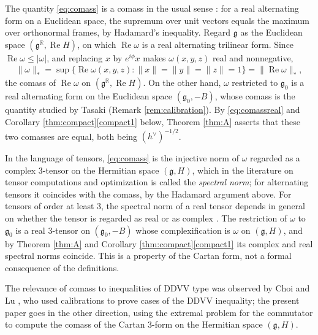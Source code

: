 \documentclass[leqno,10pt]{amsart}
\theoremstyle{definition}
\numberwithin{equation}{section}
\newcommand{\om}{\omega}
\newcommand{\re}{\operatorname{Re}}
\newcommand{\g}{\mathfrak{g}}
\newcommand{\rea}{\mathbb R}
\newcommand{\gz}{\g_{0}}
\newcommand{\hv}{h^\vee}
\newcommand{\norm}[1]{\lVert #1\rVert}
\newcommand{\comass}[1]{\lVert #1\rVert_{\ast}}%
\begin{document}
\begin{remark}\label{rem:comass}
The quantity \eqref{eq:comass} is a comass in the usual sense \cite{Harvey-Lawson}: for a real alternating form on a Euclidean space, the supremum over unit vectors equals the maximum over orthonormal frames, by Hadamard's inequality. Regard $\g$ as the Euclidean space $(\g^{\rea}, \re H)$, on which $\re\om$ is a real alternating trilinear form. Since $\re\om \leq |\om|$, and replacing $x$ by $e^{i\phi}x$ makes $\om(x, y, z)$ real and nonnegative,
\begin{align}\label{eq:comassreal}
\comass{\om} = \sup\big\{\re\om(x, y, z): \norm{x} = \norm{y} = \norm{z} = 1\big\} = \comass{\re\om},
\end{align}
the comass of $\re\om$ on $(\g^{\rea}, \re H)$. On the other hand, $\om$ restricted to $\gz$ is a real alternating form on the Euclidean space $(\gz, -B)$, whose comass is the quantity studied by Tasaki \cite{Tasaki-calibration} (Remark \ref{rem:calibration}). By \eqref{eq:comassreal} and Corollary \ref{thm:compact}\ref{compact1} below, Theorem \ref{thm:A} asserts that these two comasses are equal, both being $(\hv)^{-1/2}$.

In the language of tensors, \eqref{eq:comass} is the injective norm of $\om$ regarded as a complex $3$-tensor on the Hermitian space $(\g, H)$, which in the literature on tensor computations and optimization is called the \emph{spectral norm}; for alternating tensors it coincides with the comass, by the Hadamard argument above. For tensors of order at least $3$, the spectral norm of a real tensor depends in general on whether the tensor is regarded as real or as complex \cite{Friedland-Lim-nuclear}. The restriction of $\om$ to $\gz$ is a real $3$-tensor on $(\gz, -B)$ whose complexification is $\om$ on $(\g, H)$, and by Theorem \ref{thm:A} and Corollary \ref{thm:compact}\ref{compact1} its complex and real spectral norms coincide. This is a property of the Cartan form, not a formal consequence of the definitions.

The relevance of comass to inequalities of DDVV type was observed by Choi and Lu \cite{Choi-Lu}, who used calibrations to prove cases of the DDVV inequality; the present paper goes in the other direction, using the extremal problem for the commutator to compute the comass of the Cartan $3$-form on the Hermitian space $(\g, H)$.
\end{remark}
\end{document}

